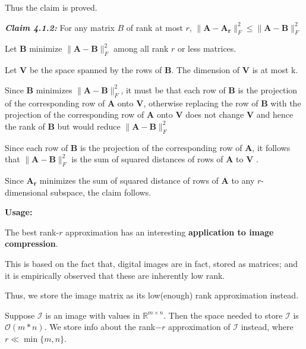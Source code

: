 \documentclass[fleqn, 11pt]{article}
\newcommand{\bs}[1]{\boldsymbol{#1}}
\newcommand{\R}[0]{\mathbb{R}}
\begin{document}
Thus the claim is proved. 

\bigskip 

{ \large  \textbf{\textit{Claim 4.1.2:}}} For any matrix $B$ of rank at most $r$, 
$  \|\boldsymbol{A}-\boldsymbol{A_r}\|^2_F \leq \|\boldsymbol{A}-\boldsymbol{B}\|^2_F $

\medskip 

Let $\bs{B}$ minimize $ \|\boldsymbol{A}-\boldsymbol{B}\|^2_F$ among all rank $r$ or less matrices.

\smallskip

Let $\bs{V}$ be the space
spanned by the rows of $\bs{B}$. The dimension of $\bs{V}$  is at most k.  

\medskip

Since  $\bs{B}$ minimizes $ \|\boldsymbol{A}-\boldsymbol{B}\|^2_F$, it must be that each row of $\bs{B}$ is the projection of the corresponding row of $\bs{A}$ onto $\bs{V}$, otherwise replacing the row of $\bs{B}$ with the projection of the corresponding row of $\bs{A}$ onto $\bs{V}$
does not change $\bs{V}$ and hence the rank of $\bs{B}$ but would reduce $ \|\boldsymbol{A}-\boldsymbol{B}\|^2_F$

\smallskip

Since each row
of $\bs{B}$ is the projection of the corresponding row of $\bs{A}$, it follows that $ \|\boldsymbol{A}-\boldsymbol{B}\|^2_F$ is the sum
of squared distances of rows of  $\bs{A}$  to  $\bs{V}$ .  

\smallskip

Since $\bs{A_r}$   minimizes 
the sum of squared distance
of rows of $\bs{A}$  to any $r$-dimensional subspace, the claim follows. 

\hrulefill

\bigskip 

\textbf{Usage: }

\medskip

The best rank-$r$
approximation has an interesting \textbf{application to image compression}. 

\smallskip

This is based on the fact that, digital images are in fact, stored as matrices; and it is 
empirically observed that these are inherently low rank.

\smallskip

Thus, we store the image matrix as its low(enough) rank approximation instead. 

\smallskip

Suppose $\mathcal{I}$ is an image with values in $\R^{m \times n}$. Then the space needed to store $\mathcal{I}$  
is $\mathcal{O}(m*n)$. We store info about the rank$-r$ approximation of 
$\mathcal{I}$ instead, where $r \ll \min\{m,n\}$. 
\end{document}
